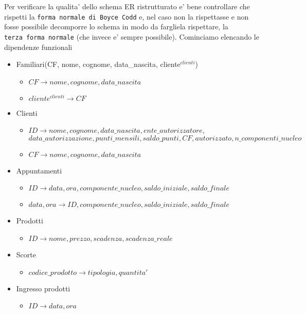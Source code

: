 \documentclass[]{article}
\providecommand{\tightlist}{%
  \setlength{\itemsep}{0pt}\setlength{\parskip}{0pt}}
\begin{document}
Per verificare la qualita' dello schema ER ristrutturato e' bene
controllare che rispetti la \texttt{forma\ normale\ di\ Boyce\ Codd} e,
nel caso non la rispettasse e non fosse possibile decomporre lo schema
in modo da fargliela rispettare, la \texttt{terza\ forma\ normale} (che
invece e' sempre possibile). Cominciamo elencando le dipendenze
funzionali

\begin{itemize}
\tightlist
\item
  Familiari(CF, nome, cognome, data\_nascita, cliente\(^{clienti}\))

  \begin{itemize}
  \tightlist
  \item
    \(CF \to nome, cognome, data\_nascita\)
  \item
    \(cliente^{clienti} \to CF\)
  \end{itemize}
\item
  Clienti

  \begin{itemize}
  \tightlist
  \item
    \(ID \to nome, cognome, data\_nascita, ente\_autorizzatore\),
    \(data\_autorizzazione, punti\_mensili, saldo\_punti, CF, autorizzato, n\_componenti\_nucleo\)
  \item
    \(CF \to nome, cognome, data\_nascita\)
  \end{itemize}
\item
  Appuntamenti

  \begin{itemize}
  \tightlist
  \item
    \(ID \to data, ora, componente\_nucleo, saldo\_iniziale, saldo\_finale\)
  \item
    \(data, ora \to ID, componente\_nucleo, saldo\_iniziale, saldo\_finale\)
  \end{itemize}
\item
  Prodotti

  \begin{itemize}
  \tightlist
  \item
    \(ID \to nome, prezzo, scadenza, scadenza\_reale\)
  \end{itemize}
\item
  Scorte

  \begin{itemize}
  \tightlist
  \item
    \(codice\_prodotto \to tipologia, quantita'\)
  \end{itemize}
\item
  Ingresso prodotti

  \begin{itemize}
  \tightlist
  \item
    \(ID \to data, ora\)
  \end{itemize}
\end{itemize}
\end{document}
